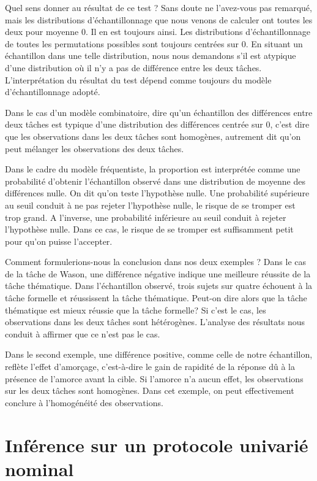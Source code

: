 \documentclass[]{book}
\theoremstyle{definition}
\theoremstyle{definition}
\theoremstyle{definition}
\theoremstyle{remark}
\begin{document}
Quel sens donner au résultat de ce test ? Sans doute ne l'avez-vous pas
remarqué, mais les distributions d'échantillonnage que nous venons de
calculer ont toutes les deux pour moyenne 0. Il en est toujours ainsi.
Les distributions d'échantillonnage de toutes les permutations possibles
sont toujours centrées sur 0. En situant un échantillon dans une telle
distribution, nous nous demandons s'il est atypique d'une distribution
où il n'y a pas de différence entre les deux tâches. L'interprétation du
résultat du test dépend comme toujours du modèle d'échantillonnage
adopté.

Dans le cas d'un modèle combinatoire, dire qu'un échantillon des
différences entre deux tâches est typique d'une distribution des
différences centrée sur 0, c'est dire que les observations dans les deux
tâches sont homogènes, autrement dit qu'on peut mélanger les
observations des deux tâches.

Dans le cadre du modèle fréquentiste, la proportion est interprétée
comme une probabilité d'obtenir l'échantillon observé dans une
distribution de moyenne des différences nulle. On dit qu'on teste
l'hypothèse nulle. Une probabilité supérieure au seuil conduit à ne pas
rejeter l'hypothèse nulle, le risque de se tromper est trop grand. A
l'inverse, une probabilité inférieure au seuil conduit à rejeter
l'hypothèse nulle. Dans ce cas, le risque de se tromper est suffisamment
petit pour qu'on puisse l'accepter.

Comment formulerions-nous la conclusion dans nos deux exemples ? Dans le
cas de la tâche de Wason, une différence négative indique une meilleure
réussite de la tâche thématique. Dans l'échantillon observé, trois
sujets sur quatre échouent à la tâche formelle et réussissent la tâche
thématique. Peut-on dire alors que la tâche thématique est mieux réussie
que la tâche formelle? Si c'est le cas, les observations dans les deux
tâches sont hétérogènes. L'analyse des résultats nous conduit à affirmer
que ce n'est pas le cas.

Dans le second exemple, une différence positive, comme celle de notre
échantillon, reflète l'effet d'amorçage, c'est-à-dire le gain de
rapidité de la réponse dû à la présence de l'amorce avant la cible. Si
l'amorce n'a aucun effet, les observations sur les deux tâches sont
homogènes. Dans cet exemple, on peut effectivement conclure à
l'homogénéité des observations.

\hypertarget{inference-sur-un-protocole-univarie-nominal}{%
\section{Inférence sur un protocole univarié
nominal}\label{inference-sur-un-protocole-univarie-nominal}}
\end{document}
